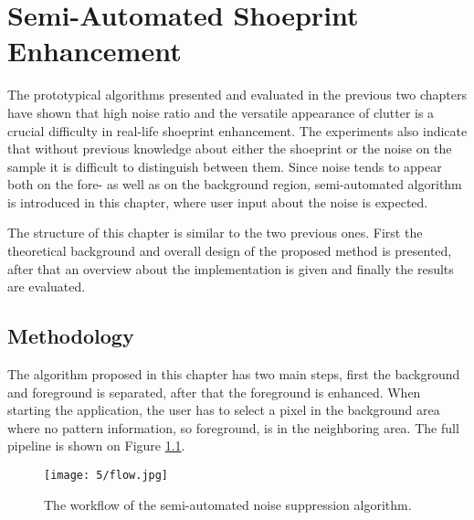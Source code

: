 \documentclass[draft,final]{vutinfth} %
\begin{document}
\chapter{Semi-Automated Shoeprint Enhancement}
\par
The prototypical algorithms presented and evaluated in the previous two chapters have shown that high noise ratio and the versatile appearance of clutter is a crucial difficulty in real-life shoeprint enhancement.
The experiments also indicate that without previous knowledge about either the shoeprint or the noise on the sample it is difficult to distinguish between them.
Since noise tends to appear both on the fore- as well as on the background region, semi-automated algorithm is introduced in this chapter, where user input about the noise is expected.
\par
The structure of this chapter is similar to the two previous ones.
First the theoretical background and overall design of the proposed method is presented, after that an overview about the implementation is given and finally the results are evaluated.

\section{Methodology}
\par
The algorithm proposed in this chapter has two main steps, first the background and foreground is separated, after that the foreground is enhanced.
When starting the application, the user has to select a pixel in the background area where no pattern information, so foreground, is in the neighboring area.
The full pipeline is shown on Figure \ref{fig:sans:workflow}.

\begin{figure}[h]
  \centering
  \texttt{[image: 5/flow.jpg]}
  \caption{The workflow of the semi-automated noise suppression algorithm.}
  \label{fig:sans:workflow} %
\end{figure}
\end{document}
